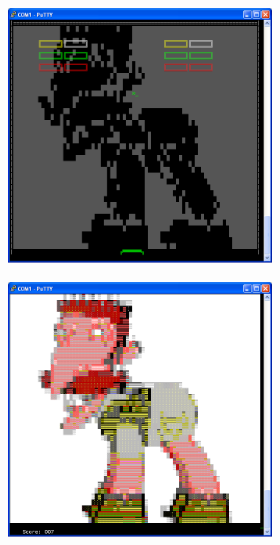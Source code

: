 \begin{figure}
\begin{subfigure}[c]{\columnwidth}
\begin{subfigure}{0.3\linewidth}
		\end{subfigure}
		\begin{subfigure}{0.3\linewidth}
			\includegraphics[scale=0.3]{pictures/level_3.PNG}
		\end{subfigure}
		\begin{subfigure}{0.3\linewidth}
			\includegraphics[scale=0.3]{pictures/level_3_complete.PNG}

\end{subfigure}
\end{subfigure}
\end{figure}
